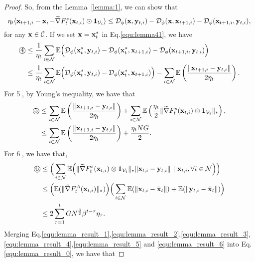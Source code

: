 \begin{proof}
		So, from the Lemma~\ref{lemma:1}, we can show that
		\begin{equation}\label{equ:lemma41}
			\eta_{t}\langle	\mathbf{x}_{t+1,i}-\mathbf{x},-\widetilde{\nabla} F_{t}^{s}(\mathbf{x}_{t,i})\odot\mathbf{1}_{\mathcal{V}_{i}}\rangle\le \mathcal{D}_{\phi}(\mathbf{x},\mathbf{y}_{t,i})-\mathcal{D}_{\phi}(\mathbf{x},\mathbf{x}_{t+1,i})-\mathcal{D}_{\phi}(\mathbf{x}_{t+1,i},\mathbf{y}_{t,i}),
		\end{equation} for any $\mathbf{x}\in\mathcal{C}$.
		If we set $\mathbf{x}=\mathbf{x}^{*}_{t}$ in Eq.\eqref{equ:lemma41},  we have  
		\begin{equation}
			\label{equ:lemma_result_4}
			\begin{aligned}
				\text{\textcircled{4}}&\le \frac{1}{\eta_{t}}\sum_{i\in\mathcal{N}}\mathbb{E}\Big(\mathcal{D}_{\phi}(\mathbf{x}^{*}_{t},\mathbf{y}_{t,i})-\mathcal{D}_{\phi}(\mathbf{x}^{*}_{t},\mathbf{x}_{t+1,i})-\mathcal{D}_{\phi}(\mathbf{x}_{t+1,i},\mathbf{y}_{t,i})\Big)\\
				&\le \frac{1}{\eta_{t}}\sum_{i\in\mathcal{N}}\mathbb{E}\Big(\mathcal{D}_{\phi}(\mathbf{x}^{*}_{t},\mathbf{y}_{t,i})-\mathcal{D}_{\phi}(\mathbf{x}^{*}_{t},\mathbf{x}_{t+1,i})\Big)-\sum_{i\in\mathcal{N}}\mathbb{E}\left(\frac{\|\mathbf{x}_{t+1,i}-\mathbf{y}_{t,i}\|}{2\eta_{t}}\right).
			\end{aligned}
		\end{equation}
		For \textcircled{5}, by Young's inequality, we have that
		\begin{equation}
			\label{equ:lemma_result_5}
			\begin{aligned}
				\text{\textcircled{5}}&\le\sum_{i\in\mathcal{N}}\mathbb{E}\left(\frac{\|\mathbf{x}_{t+1,i}-\mathbf{y}_{t,i}\|}{2\eta_{t}}\right)+\sum_{i\in\mathcal{N}}\mathbb{E}\left(\frac{\eta_{t}}{2}\|\widetilde{\nabla} F_{t}^{s}(\mathbf{x}_{t,i})\otimes\mathbf{1}_{\mathcal{V}_{i}}\|_{*}\right),\\
				&\le\sum_{i\in\mathcal{N}}\mathbb{E}\left(\frac{\|\mathbf{x}_{t+1,i}-\mathbf{y}_{t,i}\|}{2\eta_{t}}\right)+\frac{\eta_{t}NG}{2}.
			\end{aligned}
		\end{equation}
		For \textcircled{6}, we have that,
		\begin{equation}
			\label{equ:lemma_result_6}
			\begin{aligned}
				\text{\textcircled{6}}&\le\Big(\sum_{i\in\N}\E\Big(\|\widetilde{\nabla} F_{t}^{s}(\x_{t,i})\otimes\one_{\V_{i}}\|_{*}\|\x_{t,i}-\y_{t,i}\|\ |\ \x_{t,i},\forall i\in\N\Big)\Big)\\
				&\le \Big(\E(\|\tilde{\nabla} F_{t}^{A}(\x_{t,i})\|_{*})\Big)\Big(\sum_{i\in\N}\E(\|	\x_{t,i}-\bar{\x}_{t}\|)+\E(\|	\y_{t,i}-\bar{\x}_{t}\|)\Big)\\
				&\le2\sum_{\tau=1}^{t}GN^{\frac{3}{2}}\beta^{t-\tau}\eta_{\tau}.
			\end{aligned}
		\end{equation}
		Merging Eq.\eqref{equ:lemma_result_1},\eqref{equ:lemma_result_2},\eqref{equ:lemma_result_3},\eqref{equ:lemma_result_4},\eqref{equ:lemma_result_5} and \eqref{equ:lemma_result_6} into Eq.\eqref{equ:lemma_result_0}, we have that

\end{proof}
